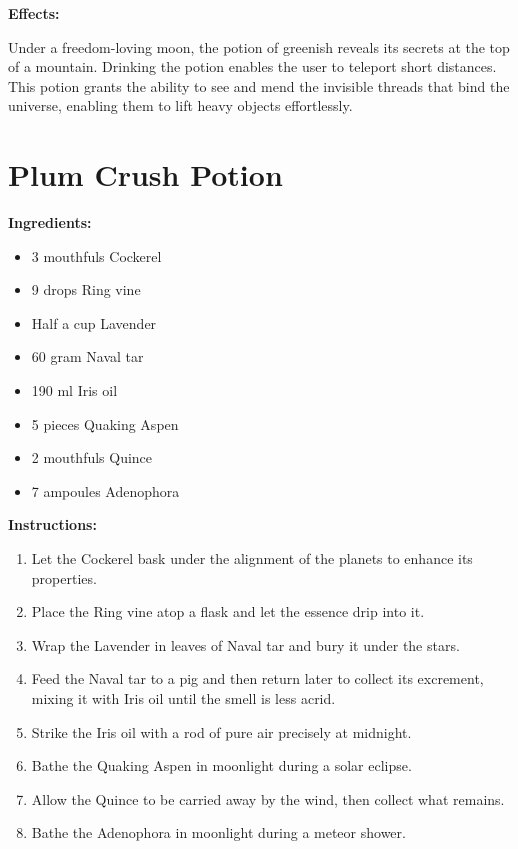 \documentclass{article}
\begin{document}
\textbf{Effects:}

Under a freedom-loving moon, the potion of greenish reveals its secrets at the top of a mountain. Drinking the potion enables the user to teleport short distances. This potion grants the ability to see and mend the invisible threads that bind the universe, enabling them to lift heavy objects effortlessly.

\newpage
\section*{Plum Crush Potion}

\textbf{Ingredients:}

\begin{itemize}
  \item 3 mouthfuls Cockerel
  \item 9 drops Ring vine
  \item Half a cup Lavender
  \item 60 gram Naval tar
  \item 190 ml Iris oil
  \item 5 pieces Quaking Aspen
  \item 2 mouthfuls Quince
  \item 7 ampoules Adenophora
\end{itemize}

\textbf{Instructions:}

\begin{enumerate}
  \item Let the Cockerel bask under the alignment of the planets to enhance its properties.
  \item Place the Ring vine atop a flask and let the essence drip into it.
  \item Wrap the Lavender in leaves of Naval tar and bury it under the stars.
  \item Feed the Naval tar to a pig and then return later to collect its excrement, mixing it with Iris oil until the smell is less acrid.
  \item Strike the Iris oil with a rod of pure air precisely at midnight.
  \item Bathe the Quaking Aspen in moonlight during a solar eclipse.
  \item Allow the Quince to be carried away by the wind, then collect what remains.
  \item Bathe the Adenophora in moonlight during a meteor shower.
\end{enumerate}
\end{document}
